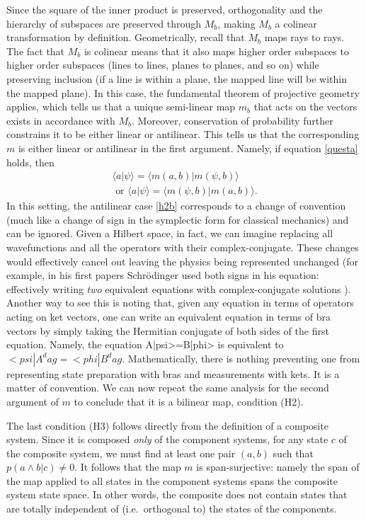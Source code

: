 \documentclass[aps,prl,amsmath,amssymb,twocolumn,nofootinbib]{revtex4}
\theoremstyle{plain}
\theoremstyle{definition}
\theoremstyle{remark}
\def\>{\rangle}
\def\<{\langle}
\def\labell#1{\label{#1}}
\begin{document}
	Since the square of the inner product is preserved, orthogonality and
	the hierarchy of subspaces are preserved through $M_b$, making $M_b$ a
	colinear transformation by definition. Geometrically, recall that $M_b$ maps rays to rays. The fact that $M_b$ is colinear means that it also maps higher order subspaces to higher order subspaces (lines to lines, planes to planes, and so on) while preserving inclusion (if a line is within a plane, the mapped line will be within the mapped plane). In this case, the fundamental
	theorem of projective geometry \cite{fun} applies, which tells us that
	a unique semi-linear map $m_b$ that acts on the vectors exists in accordance with $M_b$.
	Moreover, conservation of probability further constrains it to be
	either linear or antilinear. This tells us that the corresponding $m$
	is either linear or antilinear in the first argument. Namely, if equation
	\eqref{questa} holds, then
	\begin{align}
	\<a|\psi\>=\<m(a,b)|m(\psi,b)\>\labell{h2}\;
	\\\mbox{ or }
	\<a|\psi\>=\<m(\psi,b)|m(a,b)\> \labell{h2b}.
	\end{align}
	In this setting, the antilinear case \eqref{h2b} corresponds to a change of convention (much like a change of sign in the symplectic form for classical mechanics) and can be ignored. Given a Hilbert space, in fact, we can imagine replacing all wavefunctions and all the operators with their complex-conjugate. These changes would effectively cancel out leaving the physics being represented unchanged  (for example, in his first papers
	Schr\"odinger used both signs in his equation: effectively writing
	{\em two} equivalent equations with complex-conjugate solutions
	\cite{sch}). Another way to see this is noting that, given any equation 
	in terms of operators acting on ket vectors, one can write an
	equivalent equation in terms of bra vectors by simply taking the
	Hermitian conjugate of both sides of the first equation. Namely, the
	equation A|psi>=B|phi> is equivalent to $<psi|A^dag=<phi|B^dag$.  Mathematically, there is nothing preventing one from representing state preparation with bras and measurements with kets. It is a matter of convention. We can now repeat the same analysis for the second
	argument of $m$ to conclude that it is a bilinear map, condition (H2).
	
	The last condition (H3) follows directly from the definition of a
	composite system. Since it is composed {\em only} of the component
	systems, for any state $c$ of the composite system, we must find at least one pair $(a, b)$ such that $p(a\wedge b | c)\neq 0$. It follows that the map $m$ is span-surjective: namely the
	span of the map applied to all states in the component systems spans
	the composite system state space. In other words, the composite does
	not contain states that are totally independent of (i.e.~orthogonal
	to) the states of the components.
	
\end{document}
